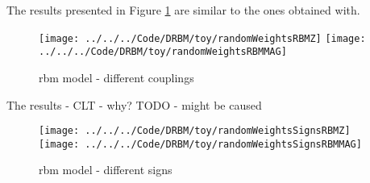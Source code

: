 \documentclass[../report/report.tex]{subfiles}
\begin{document}
The results presented in Figure \ref{fig:rbmRandom} are similar to the ones obtained with.
\begin{figure}[!htb]
%
 \texttt{[image: ../../../Code/DRBM/toy/randomWeightsRBMZ]}
\endminipage 
{}  
 \texttt{[image: ../../../Code/DRBM/toy/randomWeightsRBMMAG]}
\endminipage\hfill
\label{fig:rbmRandom}
  \caption[1]{rbm model - different couplings}
\end{figure}


The results - CLT - why? TODO - might be caused 
\begin{figure}[!htb]
%
 \texttt{[image: ../../../Code/DRBM/toy/randomWeightsSignsRBMZ]}
\endminipage 
{}  
 \texttt{[image: ../../../Code/DRBM/toy/randomWeightsSignsRBMMAG]}
\endminipage\hfill
\label{fig:gridModel}
  \caption[1]{rbm model - different signs}
\end{figure}

\newpage
\end{document}
